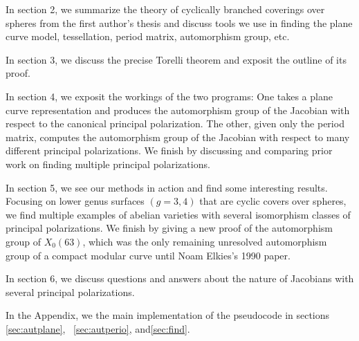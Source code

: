 \documentclass[12pt,reqno]{amsart}
\theoremstyle{definition}
\theoremstyle{remark}
\newtheorem*{remark}{Remark}
\begin{document}
In section 2, we summarize the theory of cyclically branched coverings over spheres from the first author's thesis \cite{dthesis} and discuss tools we use in finding the plane curve model, tessellation, period matrix, automorphism group, etc.

In section 3, we discuss the precise Torelli theorem and exposit the outline of its proof. %

In section 4, we exposit the workings of the two programs: One takes a plane curve representation and produces the automorphism group of the Jacobian with respect to the canonical principal polarization. The other, given only the period matrix, computes the automorphism group of the Jacobian with respect to many different principal polarizations. We finish by discussing and comparing prior work on finding multiple principal polarizations.

In section 5, we see our methods in action and find some interesting results. Focusing on lower genus surfaces $(g = 3, 4)$ that are cyclic covers over spheres, we find multiple examples of abelian varieties with several isomorphism classes of principal polarizations. We finish by giving a new proof of the automorphism group of $X_0(63)$, which was the only remaining unresolved automorphism group of a compact modular curve until Noam Elkies's 1990 paper.  

In section 6, we discuss questions and answers about the nature of Jacobians with several principal polarizations. 

In the Appendix, we the main implementation of the pseudocode in sections \ref{sec:autplane}, ~\ref{sec:autperio}, and\ref{sec:find}. 




\end{document}
